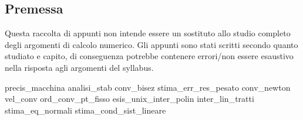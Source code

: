 \documentclass[12pt,a4paper,headings=optiontohead]{article}
\begin{document}
\begin{center}
\pagebreak

\section*{Premessa}
\begin{minipage}{0.9\textwidth} \large

Questa raccolta di appunti non intende essere un sostituto allo studio completo degli argomenti di calcolo numerico. Gli appunti sono stati scritti secondo quanto studiato e capito, di conseguenza potrebbe contenere errori/non essere esaustivo nella risposta agli argomenti del syllabus.

\end{minipage}

\end{center}
\pagebreak


\tableofcontents

\newpage
{precis_macchina}
\newpage
{analisi_stab}
{conv_bisez}
\newpage
{stima_err_res_pesato}
\newpage
{conv_newton}
\newpage
{vel_conv}
\newpage
{ord_conv_pt_fisso}
\newpage
{esis_unix_inter_polin}
\newpage
{inter_lin_tratti}
\newpage
{stima_eq_normali}
\newpage
{stima_cond_sist_lineare}
\end{document}
